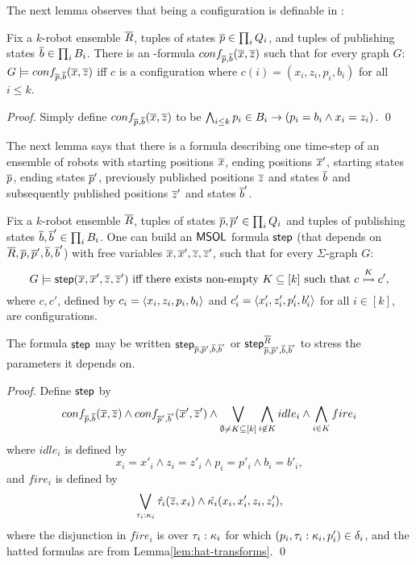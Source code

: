 \fi

The next lemma observes that being a configuration is definable in \msol:

\begin{lemma}
Fix a $k$-robot ensemble $\tup{R}$, tuples of states $\tup{p} \in \prod_i Q_i$, and tuples of publishing states 
$\tup{b} \in \prod_i B_i$. There is an \msol-formula $conf_{\tup{p},\tup{b}}(\tup{x},\tup{z})$ 
such that for every graph $G$: $G \models conf_{\tup{p},\tup{b}}(\tup{x},\tup{z})$ iff $c$ is a configuration where 
$c(i) = (x_i,z_i,p_i,b_i)$ for all $i \leq k$.
\end{lemma}
\begin{proof}
 Simply define $conf_{\tup{p},\tup{b}}(\tup{x},\tup{z})$ to be $\bigwedge_{i \leq k} p_i \in B_i \limp (p_i = b_i \wedge x_i = z_i)$. \qed
\end{proof}


The next lemma says that there is a formula describing one time-step of an ensemble of robots with starting positions $\tup{x}$, ending positions $\tup{x}'$, starting states $\tup{p}$, ending states $\tup{p}'$, previously published positions $\tup{z}$ and states $\tup{b}$ and subsequently published positions $\tup{z}'$ and states $\tup{b}'$.

\begin{lemma} \label{lem:onestep}
Fix a $k$-robot ensemble $\tup{R}$, tuples of states $\tup{p},\tup{p}' \in \prod_i Q_i$ and tuples of publishing states 
$\tup{b},\tup{b}' \in \prod_i B_i$. %
One can build an $\msol$ formula $\step$ (that depends on $\tup{R},\tup{p},\tup{p}',\tup{b},\tup{b}'$) with free variables 
$\tup{x}, \tup{x}', \tup{z},\tup{z}'$, such that for every $\Sigma$-graph $G$:
\[
 G \models \step(\tup{x}, \tup{x}', \tup{z},\tup{z}') \mbox{ iff there exists non-empty $K \subseteq [k]$ such that } \onestep{c}{c'}{K},
\]
where $c,c'$, defined by $c_i = \tpl{x_i,z_i,p_i,b_i}$ and $c'_i = \tpl{x'_i,z'_i,p'_i,b'_i}$ for all $i \in [k]$, are configurations.

The formula $\step$ may be written $\step_{\tup{p},\tup{p}',\tup{b},\tup{b}'}$ or $\step^{\tup{R}}_{\tup{p},\tup{p}',\tup{b},\tup{b}'}$ to stress the parameters it depends on.
\end{lemma}


\begin{proof}
Define $\step$ by 
\[
conf_{\tup{p},\tup{b}}(\tup{x},\tup{z}) \wedge conf_{\tup{p}',\tup{b}'}(\tup{x}',\tup{z}') \wedge \bigvee_{\emptyset \neq K \subseteq [k]}
\bigwedge_{i \not \in K} idle_i \wedge \bigwedge_{i \in K} fire_i 
\]
where $idle_i$ is defined by
\[
x_i = x'_i \wedge z_i = z'_i \wedge p_i = p'_i \wedge b_i = b'_i,
\]
and $fire_i$ is defined by
  \[
   \bigvee_{\gc{\tau_i}{\kappa_i}} \hat{\tau_i}(\tup{z},x_i) \wedge \hat{\kappa_i}(x_i,x'_i,z_i,z'_i),
  \]
where the disjunction in $fire_i$ is over $\gc{\tau_i}{\kappa_i}$ for which
$(p_i,\gc{\tau_i}{\kappa_i},p'_i) \in \delta_i$,   
and
the hatted formulas are from Lemma\ref{lem:hat-transforms}. 
\qed
\end{proof}


